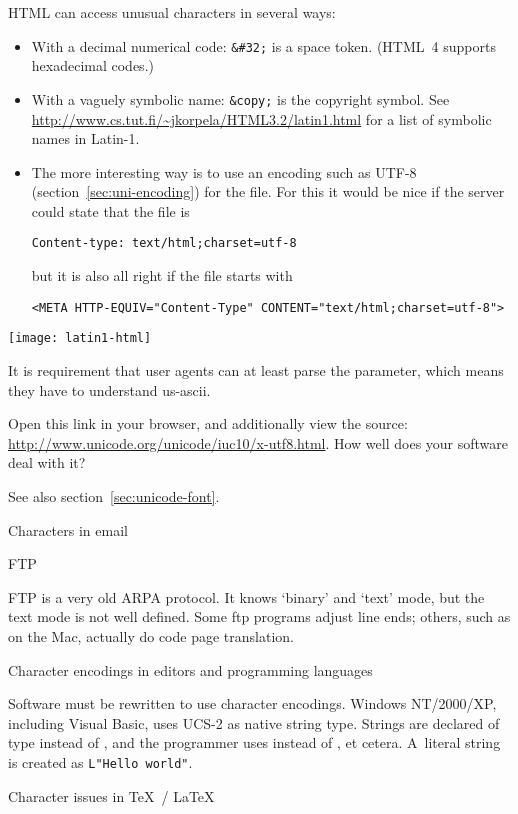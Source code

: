 HTML can access unusual characters in several ways:
\begin{itemize}
\item With a decimal numerical code: \verb+&#32;+ is a space
  token. (HTML~4 supports hexadecimal codes.)
\item With a vaguely symbolic name:
  \verb+&copy;+ is the copyright symbol. See
\url{http://www.cs.tut.fi/~jkorpela/HTML3.2/latin1.html} for a list of
symbolic names in Latin-1.
\item The more interesting way is to use an encoding such as UTF-8
  (section~\ref{sec:uni-encoding}) for the file. For this it would be
  nice if the server could state that the file is
\begin{verbatim}
Content-type: text/html;charset=utf-8
\end{verbatim}
  but it is also all right if the file starts with
\begin{verbatim}
<META HTTP-EQUIV="Content-Type" CONTENT="text/html;charset=utf-8">
\end{verbatim}
\end{itemize}

\texttt{[image: latin1-html]}

It is requirement that user agents can at least parse the 
parameter, which means they have to understand us-ascii.

Open this link in your browser, and additionally view the source:
\url{http://www.unicode.org/unicode/iuc10/x-utf8.html}. How well does
your software deal with it?

See also section~\ref{sec:unicode-font}.

 {Characters in email}
\label{sec:mime}

 {FTP}

FTP is a very old ARPA protocol. It knows `binary' and `text' mode,
but the text mode is not well defined. Some ftp programs adjust line
ends; others, such as  on the Mac, actually do code page
translation.

 {Character encodings in editors and programming languages}

Software must be rewritten to use character encodings. Windows
NT/2000/XP, including Visual Basic, uses UCS-2 as native string
type. Strings are declared of type  instead of ,
and the programmer uses  instead of , et
cetera. A~literal string is created as \verb+L"Hello world"+.

 {Character issues in \TeX\ / \LaTeX}

